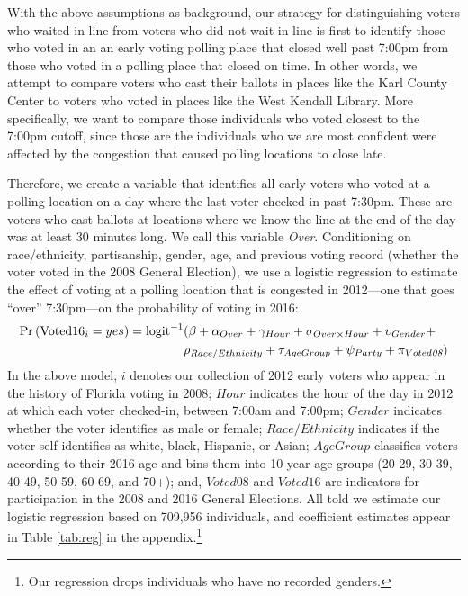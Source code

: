 \documentclass[12pt,titlepage]{article}
\begin{document}
With the above assumptions as background, our strategy for
distinguishing voters who waited in line from voters who did not wait
in line is first to identify those who voted in an an early voting
polling place that closed well past 7:00pm from those who voted in a
polling place that closed on time.  In other words, we attempt to
compare voters who cast their ballots in places like the Karl County
Center to voters who voted in places like the West Kendall Library.
More specifically, we want to compare those individuals who voted
closest to the 7:00pm cutoff, since those are the individuals who we
are most confident were affected by the congestion that caused polling
locations to close late.
 
Therefore, we create a variable that identifies all early voters who
voted at a polling location on a day where the last voter checked-in
past 7:30pm.  These are voters who cast ballots at locations where we
know the line at the end of the day was at least 30 minutes long.  We
call this variable \emph{Over}.  Conditioning on race/ethnicity,
partisanship, gender, age, and previous voting record (whether the
voter voted in the 2008 General Election), we use a logistic
regression to estimate the effect of voting at a polling location that
is congested in 2012---one that goes ``over'' 7:30pm---on the
probability of voting in 2016:
\begin{equation*}
  \begin{aligned}
    \textup{Pr}\left(\mathrm{Voted16}_{i} = yes\right) =  \textup{logit}^{-1}&(\beta + \alpha_{Over} + \gamma_{Hour} +
    \sigma_{Over \times Hour} + \upsilon_{Gender}  + \\& \rho_{Race/Ethnicity} +
      \tau_{Age Group} + \psi_{Party} + \pi_{Voted\emph{08}})
  \end{aligned}
\end{equation*}
%
In the above model, $i$ denotes our collection of 2012 early voters
who appear in the history of Florida voting in 2008; $Hour$ indicates
the hour of the day in 2012 at which each voter checked-in, between
7:00am and 7:00pm; $Gender$ indicates whether the voter identifies as
male or female; $Race/Ethnicity$ indicates if the voter
self-identifies as white, black, Hispanic, or Asian; $AgeGroup$
classifies voters according to their 2016 age and bins them into
10-year age groups (20-29, 30-39, 40-49, 50-59, 60-69, and 70+); and,
$Voted08$ and $Voted16$ are indicators for participation in the 2008
and 2016 General Elections.  All told we estimate our logistic
regression based on 709,956 individuals, and coefficient estimates
appear in Table \ref{tab:reg} in the appendix.\footnote{Our regression
  drops individuals who have no recorded
  genders.}  %
\end{document}
